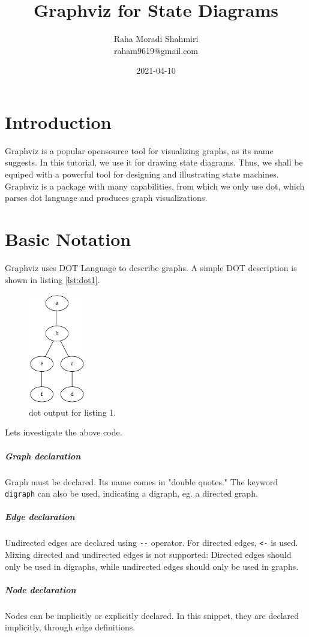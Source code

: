 \documentclass{article}
\title{Graphviz for State Diagrams}
\date{2021-04-10}
\author{Raha Moradi Shahmiri\\raham9619@gmail.com}
\begin{document}
	\maketitle
	\newpage


	\section{Introduction}
	Graphviz is a popular opensource tool for visualizing graphs, as its name suggests. In this tutorial, we use it for drawing state diagrams. Thus, we shall be equiped with a powerful tool for designing and illustrating state machines. Graphviz is a package with many capabilities, from which we only use dot, which parses dot language and produces graph visualizations.

	\section{Basic Notation}
	Graphviz uses DOT Language to describe graphs. A simple DOT description is shown in listing \ref{lst:dot1}.

	
	
	\begin{figure}[H]
		\begin{center}
			\includegraphics[width=25mm]{figure1.png}
		\end{center}
		\caption{dot output for listing 1.}
		\label{fig:png1}
	\end{figure}

	Lets investigate the above code.
	
	\subparagraph{Graph declaration}
		Graph must be declared. Its name comes in "double quotes." The keyword \lstinline{digraph} can also be used, indicating a digraph, eg. a directed graph.
	
	\subparagraph{Edge declaration}
		Undirected edges are declared using \lstinline{--} operator. For directed edges, \lstinline{<-} is used. Mixing directed and undirected edges is not supported: Directed edges should only be used in digraphs, while undirected edges should only be used in graphs.

	\subparagraph{Node declaration}
		Nodes can be implicitly or explicitly declared. In this snippet, they are declared implicitly, through edge definitions.
\end{document}
